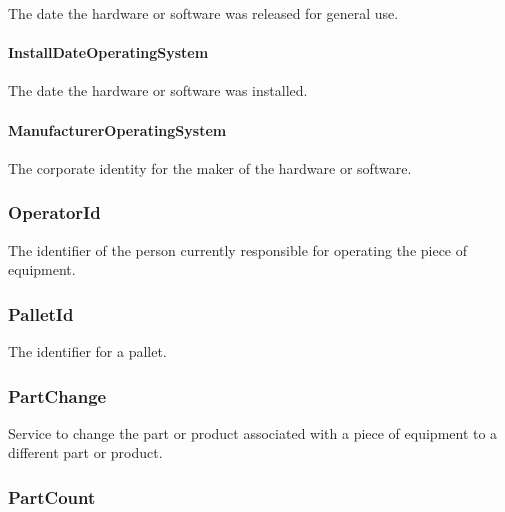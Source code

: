 The date the hardware or software was released for general use.



\paragraph{InstallDateOperatingSystem}\mbox{}
\label{sec:InstallDateOperatingSystem}



The date the hardware or software was installed.


\paragraph{ManufacturerOperatingSystem}\mbox{}
\label{sec:ManufacturerOperatingSystem}



The corporate identity for the maker of the hardware or software.



\subsubsection{OperatorId}
\label{sec:OperatorId}



The identifier of the person currently responsible for operating the piece of equipment.

\FloatBarrier

\subsubsection{PalletId}
\label{sec:PalletId}



The identifier for a pallet.

\FloatBarrier

\subsubsection{PartChange}
\label{sec:PartChange}



Service to change the part or product associated with a piece of equipment to a different part or product.

\FloatBarrier

\subsubsection{PartCount}
\label{sec:PartCount}



